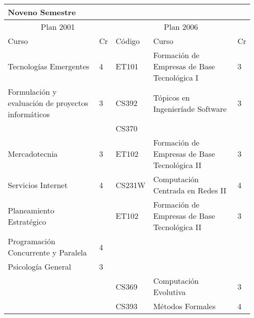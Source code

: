 \begin{center}
\begin{tabularx}{0.95\textwidth}{|p{4cm}|p{1cm}||p{2cm}|X|p{1cm}|}\hline
\multicolumn{5}{|l|}{\textbf{Noveno Semestre}} \\ \hline
\multicolumn{2}{|c|}{Plan 2001} & \multicolumn{3}{|c|}{Plan 2006} \\ \hline
Curso & Cr & Código & Curso & Cr \\ \hline
Tecnologías Emergentes & 4 & ET101 & Formación de Empresas de Base Tecnológica I & 3 \\ \hline
Formulación y evaluación de proyectos informáticos & 3 & CS392 & Tópicos en Ingenieríade Software & 3 \\ \hline
 &  & CS370 &  & \\ \hline
Mercadotecnia & 3 & ET102 & Formación de Empresas de Base Tecnológica II & 3 \\ \hline
Servicios Internet & 4 & CS231W & Computación Centrada en Redes II & 4 \\ \hline
Planeamiento Estratégico &  & ET102 & Formación de Empresas de Base Tecnológica II & 3 \\ \hline
Programación Concurrente y Paralela & 4 &  &  & \\ \hline
Psicología General & 3 &  &  & \\ \hline
 &  & CS369 & Computación Evolutiva & 3 \\ \hline
 &  & CS393 & Métodos Formales & 4 \\ \hline
\end{tabularx}
\end{center}

